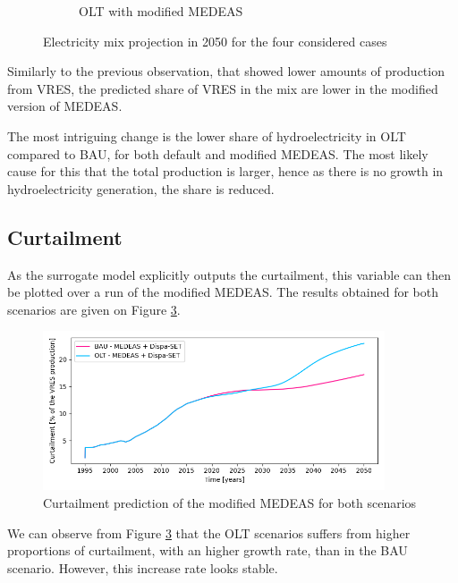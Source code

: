 \begin{figure}[h]
\begin{subfigure}{0.34\textwidth}
        \caption{OLT with modified MEDEAS}
        \label{fig:electricity-mix-OLT-dispa}
    \end{subfigure}
    \caption{Electricity mix projection in 2050 for the four considered cases}
    \label{fig:electricity-mixes}
\end{figure}

Similarly to the previous observation, that showed lower amounts of production from VRES, the predicted share of VRES in the mix are lower in the modified version of MEDEAS.

The most intriguing change is the lower share of hydroelectricity in OLT compared to BAU, for both default and modified MEDEAS. The most likely cause for this that the total production is larger, hence as there is no growth in hydroelectricity generation, the share is reduced. 

\subsection{Curtailment}

As the surrogate model explicitly outputs the curtailment, this variable can then be plotted over a run of the modified MEDEAS. The results obtained for both scenarios are given on Figure \ref{fig:electricity-production-curtailed}.

\begin{figure}[h]
    \centering
    \includegraphics[width=0.9\textwidth]{resources/images/electricity-production-curtailed.png}
    \caption{Curtailment prediction of the modified MEDEAS for both scenarios}
    \label{fig:electricity-production-curtailed}
\end{figure}

We can observe from Figure \ref{fig:electricity-production-curtailed} that the OLT scenarios suffers from higher proportions of curtailment, with an higher growth rate, than in the BAU scenario. However, this increase rate looks stable.

